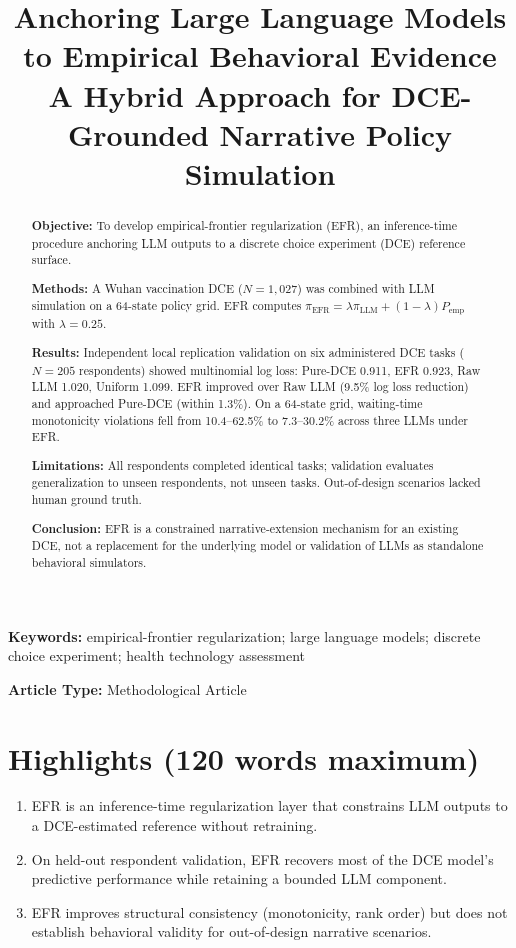 \documentclass[12pt]{article}
\title{\textbf{Anchoring Large Language Models to Empirical Behavioral Evidence}\\[0.5em]
\large A Hybrid Approach for DCE-Grounded Narrative Policy Simulation}
\author{}
\date{}
\begin{document}
\maketitle

\begin{abstract}
\noindent\textbf{Objective:} To develop empirical-frontier regularization (EFR), an inference-time procedure anchoring LLM outputs to a discrete choice experiment (DCE) reference surface.

\noindent\textbf{Methods:} A Wuhan vaccination DCE ($N=1{,}027$) was combined with LLM simulation on a 64-state policy grid. EFR computes $\pi_{\text{EFR}} = \lambda\pi_{\text{LLM}} + (1-\lambda)P_{\text{emp}}$ with $\lambda=0.25$.

\noindent\textbf{Results:} Independent local replication validation on six administered DCE tasks ($N=205$ respondents) showed multinomial log loss: Pure-DCE 0.911, EFR 0.923, Raw LLM 1.020, Uniform 1.099. EFR improved over Raw LLM (9.5\% log loss reduction) and approached Pure-DCE (within 1.3\%). On a 64-state grid, waiting-time monotonicity violations fell from 10.4--62.5\% to 7.3--30.2\% across three LLMs under EFR.

\noindent\textbf{Limitations:} All respondents completed identical tasks; validation evaluates generalization to unseen respondents, not unseen tasks. Out-of-design scenarios lacked human ground truth.

\noindent\textbf{Conclusion:} EFR is a constrained narrative-extension mechanism for an existing DCE, not a replacement for the underlying model or validation of LLMs as standalone behavioral simulators.
\end{abstract}

\vspace{1em}
\noindent\textbf{Keywords:} empirical-frontier regularization; large language models; discrete choice experiment; health technology assessment

\vspace{1em}
\noindent\textbf{Article Type:} Methodological Article

\vspace{2em}
\section*{Highlights (120 words maximum)}
\begin{enumerate}[leftmargin=*]
    \item EFR is an inference-time regularization layer that constrains LLM outputs to a DCE-estimated reference without retraining.
    \item On held-out respondent validation, EFR recovers most of the DCE model's predictive performance while retaining a bounded LLM component.
    \item EFR improves structural consistency (monotonicity, rank order) but does not establish behavioral validity for out-of-design narrative scenarios.
\end{enumerate}
\end{document}
